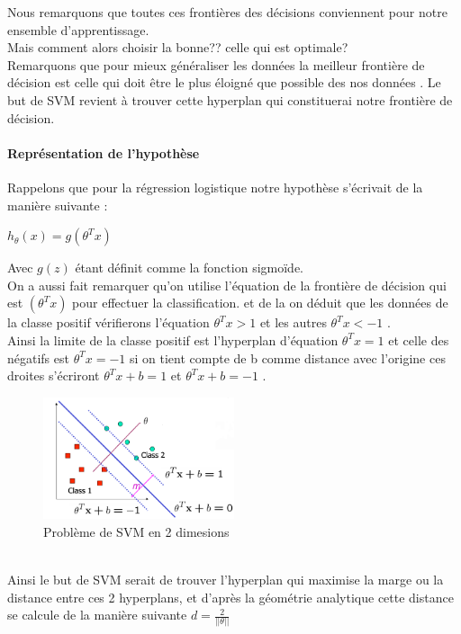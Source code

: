 Nous remarquons que toutes ces frontières des décisions conviennent pour notre ensemble d'apprentissage.\\ Mais comment alors choisir la bonne?? celle qui est optimale?\\
Remarquons que pour mieux généraliser les données la meilleur  frontière de décision est celle qui doit être le plus éloigné que possible des nos données .  
Le but de SVM revient à trouver cette hyperplan qui constituerai notre frontière de décision.
\paragraph{Représentation de l'hypothèse }
Rappelons que pour la régression logistique notre hypothèse s'écrivait de la manière suivante :
\begin{center}
	${h}_{\theta}\left(x\right)=g({\theta }^{T}{x})$
\end{center} Avec $g(z)$ étant définit comme la fonction sigmoïde.\\
On a aussi fait remarquer qu'on utilise l'équation de la frontière  de décision qui est $({\theta }^{T}{x})$ pour effectuer la classification.
et de la on déduit que les données de la classe positif vérifierons l'équation ${\theta }^{T}{x} > 1$ et les autres ${\theta }^{T}{x} <-1$ .\\
Ainsi la limite de la classe positif est l'hyperplan d'équation  ${\theta }^{T}{x} = 1$  et celle des négatifs est ${\theta }^{T}{x} =-1$ si on tient compte de b comme distance avec l'origine ces droites s'écriront 
${\theta }^{T}{x} + b = 1$  et ${\theta }^{T}{x} + b=- 1$ .
 \begin{figure}[ht]
 	\centering
 	\includegraphics[width=0.5\textwidth]{fig/SVN2D.png}
 	\caption[Short caption]{Problème de SVM en 2 dimesions  }
 	\label{fig:image14}
 \end{figure}\\
Ainsi le but de SVM serait de trouver l'hyperplan qui maximise la marge ou la distance  entre ces 2  hyperplans, et d'après la géométrie analytique cette distance se calcule de la manière suivante $d =\frac{2}{||\theta||}$
